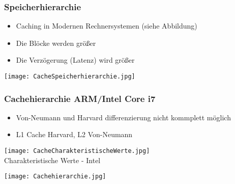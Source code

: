 		\subsubsection{Speicherhierarchie}
			\begin{minipage}{0.5\textwidth}
				\begin{itemize}
					\item Caching in Modernen Rechnersystemen (siehe Abbildung)
					\item Die Blöcke werden grö\ss er 
					\item Die Verzögerung (Latenz) wird grö\ss er
				\end{itemize}
			\end{minipage}
			\begin{minipage}{0.45\textwidth}
				\begin{center}
					\texttt{[image: CacheSpeicherhierarchie.jpg]}
				\end{center}
			\end{minipage}


		\subsubsection{Cachehierarchie ARM/Intel Core i7}
			\begin{minipage}{0.5\textwidth}
				\begin{itemize}
					\item Von-Neumann und Harvard differenzierung nicht kommplett möglich
					\item L1 Cache Harvard, L2 Von-Neumann
				\end{itemize}

				\vspace{0.4cm}
				\begin{center}
					\texttt{[image: CacheCharakteristischeWerte.jpg]} \\
					Charakteristische Werte - Intel
				\end{center}
			\end{minipage}
			\begin{minipage}{0.45\textwidth}
				\begin{center}
					\texttt{[image: Cachehierarchie.jpg]}
				\end{center}
			\end{minipage}
			
